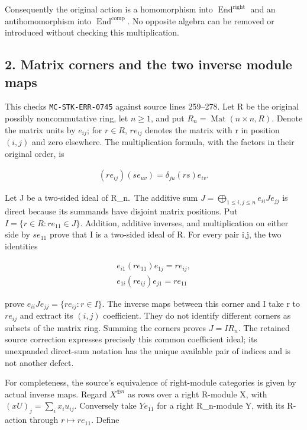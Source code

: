 Consequently the original action is a homomorphism into \(\operatorname{End}^{\mathrm{right}}\) and an antihomomorphism into \(\operatorname{End}^{\mathrm{comp}}\). No opposite algebra can be removed or introduced without checking this multiplication.

\subsection{2. Matrix corners and the two inverse module maps}\label{matrix-corners-and-the-two-inverse-module-maps}

This checks \texttt{MC-STK-ERR-0745} against source lines 259--278. Let R be the original possibly noncommutative ring, let \(n\geq 1\), and put \(R_{n}=\operatorname{Mat}(n\times n,R)\). Denote the matrix units by \(e_{ij}\); for \(r\in R\), \(r e_{ij}\) denotes the matrix with r in position \((i,j)\) and zero elsewhere. The multiplication formula, with the factors in their original order, is

\[\begin{gathered}
(r e_{ij})(s e_{uv}) = \delta _{ju} (rs)e_{iv}.
\end{gathered}\]

Let J be a two-sided ideal of R\_n.~The additive sum \(J=\bigoplus _{1\leq i,j\leq n} e_{ii} J e_{jj}\) is direct because its summands have disjoint matrix positions. Put \(I=\{r\in R : r e_{11}\in J\}\). Addition, additive inverses, and multiplication on either side by \(s e_{11}\) prove that I is a two-sided ideal of R. For every pair i,j, the two identities

\[\begin{gathered}
e_{i1} (r e_{11})e_{1j} = r e_{ij},\\e_{1i} (r e_{ij})e_{j1} = r e_{11}
\end{gathered}\]

prove \(e_{ii} J e_{jj}=\{r e_{ij}:r\in I\}\). The inverse maps between this corner and I take r to \(r e_{ij}\) and extract its \((i,j)\) coefficient. They do not identify different corners as subsets of the matrix ring. Summing the corners proves \(J=I R_{n}\). The retained source correction expresses precisely this common coefficient ideal; its unexpanded direct-sum notation has the unique available pair of indices and is not another defect.

For completeness, the source's equivalence of right-module categories is given by actual inverse maps. Regard \(X^{\oplus n}\) as rows over a right R-module X, with \((xU)_{j}=\sum _{i} x_{i} u_{ij}\). Conversely take \(Y e_{11}\) for a right R\_n-module Y, with its R-action through \(r\mapsto r e_{11}\). Define

